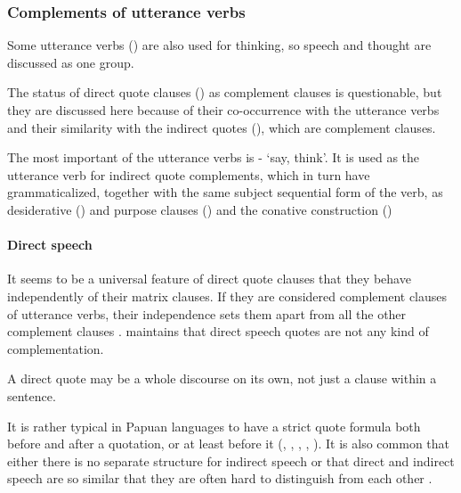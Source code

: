 \subsubsection[Complements of utterance verbs]{Complements of utterance verbs}

Some utterance verbs () are also used for thinking, so speech and thought are discussed as one group. 

The status of direct quote clauses () as complement clauses is questionable, but they are discussed here because of their co-occurrence with the utterance verbs and their similarity with the indirect quotes (), which are complement clauses.  

The most important of the utterance verbs is - `say, think'. It is used as the utterance verb for indirect quote complements, which in turn have grammaticalized, together with the same subject sequential form of the verb, as desiderative () and purpose clauses () and the conative construction () 

\paragraph[Direct speech]{Direct speech}

It seems to be a universal feature of direct quote clauses that they behave independently of their matrix clauses. If they are considered complement clauses of utterance verbs, their independence sets them apart from all the other complement clauses \citep[303]{Munro1982}. \citet[398]{Dixon2010} maintains that direct speech quotes are not any kind of complementation.

A direct quote may be a whole discourse on its own, not just a clause within a sentence.

It is rather typical in Papuan languages to have a strict quote formula both before and after a quotation, or at least before it (\citealt[120]{Franklin1971}, \citealt[1]{Davies1981}, \citealt[12]{Roberts1987}, \citealt{Farr1999}, \citealt[128]{Hepner2002}). It is also common that either there is no separate structure for indirect speech \citep[2]{Davies1981} or that direct and indirect speech are so similar that they are often hard to distinguish from each other \citep[14]{Roberts1987}. 

